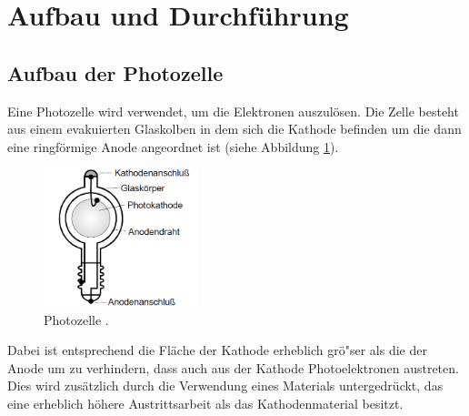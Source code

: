 \section{Aufbau und Durchführung}
\subsection{Aufbau der Photozelle }
Eine Photozelle  wird verwendet, um die Elektronen auszulösen. 
 Die Zelle besteht aus einem evakuierten Glaskolben in dem sich die Kathode befinden um die dann eine ringförmige Anode angeordnet ist (siehe Abbildung  \ref{fig:Schematisch}).
 \begin{figure}[H]
    \centering
    \includegraphics[width=0.4\textwidth]{Schematisch.png}
    \caption{Photozelle \cite{1}.}
    \label{fig:Schematisch}
\end{figure}
\noindent
Dabei ist entsprechend die Fläche der Kathode erheblich grö"ser als die der Anode um zu verhindern,
 dass auch aus der Kathode Photoelektronen austreten.
  Dies wird zusätzlich durch die Verwendung eines Materials untergedrückt, das eine erheblich höhere Austrittsarbeit als das Kathodenmaterial besitzt.\\

